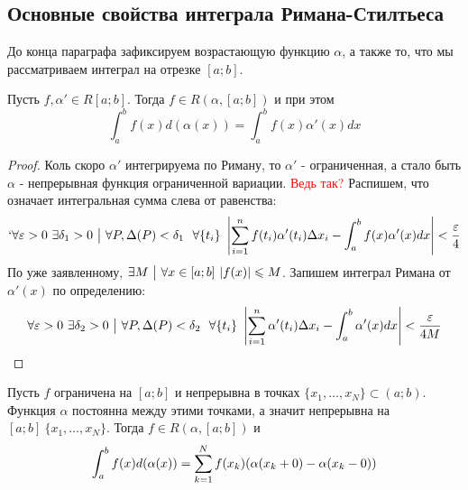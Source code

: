 \subsection{Основные свойства интеграла Римана-Стилтьеса}

\begin{note}
	До конца параграфа зафиксируем возрастающую функцию $\alpha$, а также то, что мы рассматриваем интеграл на отрезке $[a; b]$.
\end{note}


\begin{theorem}
	Пусть $f, \alpha' \in R[a; b]$. Тогда $f \in R(\alpha, [a; b])$ и при этом
	\[
		\int_a^b f(x) d(\alpha(x)) = \int_a^b f(x) \alpha'(x) dx
	\]
\end{theorem}

\begin{proof}
	Коль скоро $\alpha'$ интегрируема по Риману, то $\alpha'$ - ограниченная, а стало быть $\alpha$ - непрерывная функция ограниченной вариации. \textcolor{red}{Ведь так?} Распишем, что означает интегральная сумма слева от равенства:
	\[
	`	\forall \varepsilon > 0\ \exists \delta_1 > 0 \ \big|\  \forall P, \Delta(P) < \delta_1\ \ \forall \{t_i\}\ \left|\sum\limits_{i = 1}^n f(t_i) \alpha'(t_i) \Delta x_i - \int_a^b f(x) \alpha'(x) dx\right| < \frac{\varepsilon}{4}
	\]
	По уже заявленному, $\exists M \ \big|\  \forall x \in [a; b]\ |f(x)| \leqslant M$. Запишем интеграл Римана от $\alpha'(x)$ по определению:
	\[
		\forall \eps > 0\ \exists \delta_2 > 0 \such \forall P, \Delta(P) < \delta_2\ \ \forall \{t_i\}\ \left|\suml_{i = 1}^n \alpha'(t_i)\Delta x_i - \int_a^b \alpha'(x)dx\right| < \frac{\eps}{4M}
	\]
	
\end{proof}

\begin{theorem}
	Пусть $f$ ограничена на $[a; b]$ и непрерывна в точках $\{x_1, \ldots, x_N\} \subset (a; b)$. Функция $\alpha$ постоянна между этими точками, а значит непрерывна на $[a; b] \ \{x_1, \ldots, x_N\}$. Тогда $f \in R(\alpha, [a; b])$ и
	\[
		\int_a^b f(x)d(\alpha(x)) = \sum\limits_{k = 1}^N f(x_k) (\alpha(x_k + 0) - \alpha(x_k - 0))
	\]
\end{theorem}

